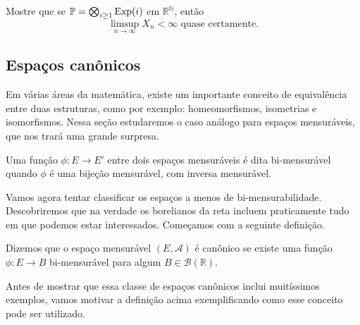 \begin{exercise}
  Mostre que se $\mathbb{P} = \bigotimes_{i \geq 1} \operatorname{Exp}(i)$ em $\mathbb{R}^\mathbb{N}$, então
  \begin{equation}
    \text{$\limsup_{n\to \infty} X_n < \infty$ quase certamente.}
  \end{equation}
\end{exercise}

\begin{topics}



\section{Espaços canônicos}


Em várias áreas da matemática, existe um importante conceito de equivalência entre duas estruturas, como por exemplo: homeomorfismos, isometrias e isomorfismos.
Nessa seção estudaremos o caso análogo para espaços mensuráveis, que nos trará uma grande surpresa.

\begin{definition}
  Uma função $\phi:E \to E'$ entre dois espaços mensuráveis é dita bi-mensurável  quando $\phi$ é uma bijeção mensurável, com inversa mensurável.
\end{definition}

Vamos agora tentar classificar os espaços a menos de bi-mensurabilidade.
Descobriremos que na verdade os borelianos da reta incluem praticamente tudo em que podemos estar interessados.
Começamos com a seguinte definição.

\begin{definition}
  Dizemos que o espaço mensurável $(E, \mathcal{A})$ é canônico  se existe uma função $\phi: E \to B$ bi-mensurável para algum $B \in \mathcal{B}(\mathbb{R})$.
\end{definition}

Antes de mostrar que essa classe de espaços canônicos inclui muitíssimos exemplos,
vamos motivar a definição acima exemplificando como esse conceito pode ser utilizado.


\end{topics}
